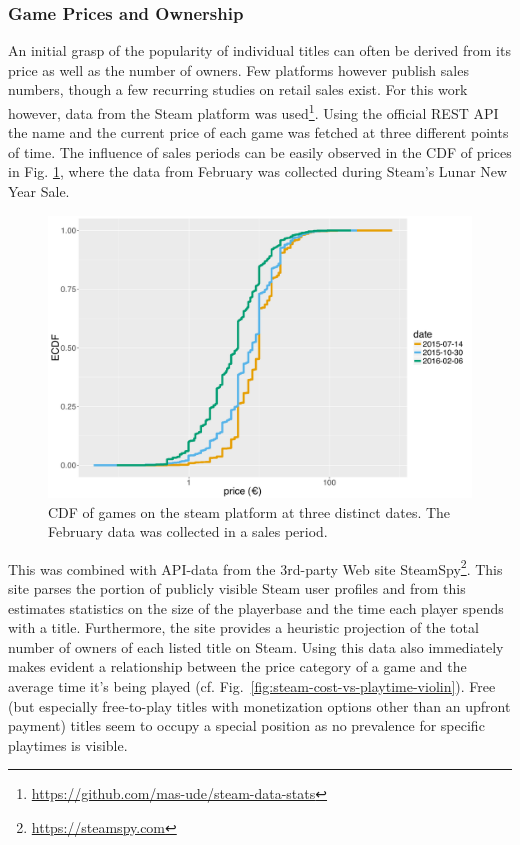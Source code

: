 


\subsubsection{Game Prices and Ownership}

An initial grasp of the popularity of individual titles can often be derived from its price as well as the number of owners. Few platforms however publish sales numbers, though a few recurring studies on retail sales exist. For this work however, data from the Steam platform was used\footnote{\url{https://github.com/mas-ude/steam-data-stats}}. Using the official \acrshort{REST} \acrshort{API} the name and the current price of each game was fetched at three different points of time. The influence of sales periods can be easily observed in the \acrshort{CDF} of prices in Fig. \ref{fig:steam-prices}, where the data from February was collected during Steam's Lunar New Year Sale.

\begin{figure}[!t]
	\centering
	\includegraphics[width=1.0\columnwidth]{images/steam-prices.pdf}
	\caption{CDF of games on the steam platform at three distinct dates. The February data was collected in a sales period.}
\label{fig:steam-prices}
\end{figure}

This was combined with \acrshort{API}-data from the 3rd-party Web site SteamSpy\footnote{\url{https://steamspy.com}}. This site parses the portion of publicly visible Steam user profiles and from this estimates statistics on the size of the playerbase and the time each player spends with a title. Furthermore, the site provides a heuristic projection of the total number of owners of each listed title on Steam. Using this data also immediately makes evident a relationship between the price category of a game and the average time it's being played (cf. Fig.~\ref{fig:steam-cost-vs-playtime-violin}). Free (but especially free-to-play titles with monetization options other than an upfront payment) titles seem to occupy a special position as no prevalence for specific playtimes is visible.

